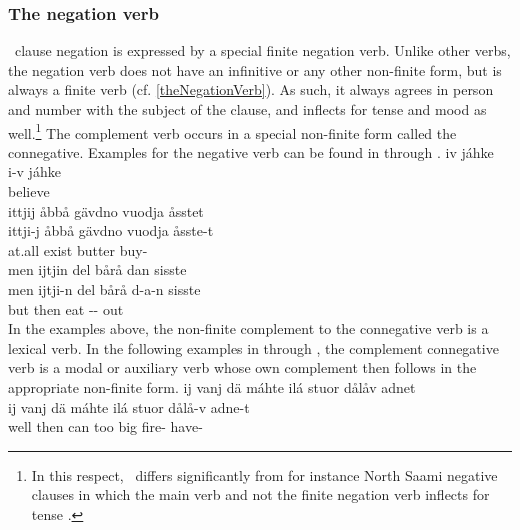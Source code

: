 \subsubsection{The negation verb}\label{negation}
\PS\ clause negation is expressed by a special finite negation verb. Unlike other verbs, the negation verb does not have an infinitive or any other non-finite form, but is always a finite verb (cf. \SEC\ref{theNegationVerb}). As such, it always agrees in person and number with the subject of the clause, and inflects for tense and mood as well.\footnote{In this respect, \PS\ differs significantly from for instance North Saami negative clauses in which the main verb and not the finite negation verb inflects for tense \citep[cf.][92]{Svonni2009}.} 
The complement verb occurs in a special non-finite form called the connegative.
Examples for the negative verb can be found in  through . 
\ea\label{negation1}%
\glll	iv jáhke\\
	i-v jáhke\\
	 believe\BS{} \\\nopagebreak
{} 
\z
\ea\label{negation2}%
\glll	ittjij åbbå gävdno vuodja åsstet\\
	ittji-j åbbå gävdno vuodja åsste-t\\
	 at.all exist\BS{} butter\BS{} buy-\\\nopagebreak
{} 
\z
\ea\label{negation3}%
\glll	men ijtjin del bårå dan sisste \\
	men ijtji-n del bårå d-a-n sisste \\
	but  then eat\BS{} -- out\\\nopagebreak
{} 
\z
In the examples above, the non-finite complement to the connegative verb is a lexical verb. In the following examples in  through , the complement connegative verb is a modal or auxiliary verb whose own complement then follows in the appropriate non-finite form.
\ea\label{negation4}%
\glll	ij vanj dä máhte ilá stuor dålåv adnet\\
	ij vanj dä máhte ilá stuor dålå-v adne-t\\
	\BS{} well then can\BS{} too big fire- have-\\\nopagebreak
